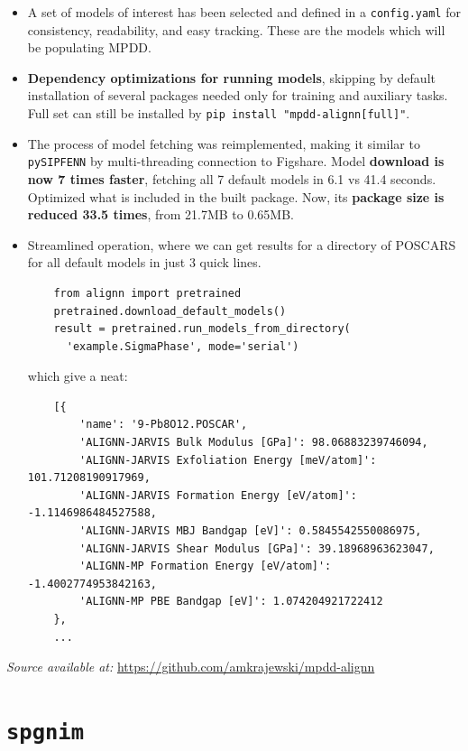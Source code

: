 \begin{itemize}
    \item A set of models of interest has been selected and defined in a \texttt{config.yaml} for consistency, readability, and easy tracking. These are the models which will be populating MPDD.
    \item \textbf{Dependency optimizations for running models}, skipping by default installation of several packages needed only for training and auxiliary tasks. Full set can still be installed by \texttt{pip install "mpdd-alignn[full]"}.
    \item The process of model fetching was reimplemented, making it similar to \texttt{pySIPFENN} by multi-threading connection to Figshare. Model \textbf{download is now 7 times faster}, fetching all 7 default models in 6.1 vs 41.4 seconds. Optimized what is included in the built package. Now, its \textbf{package size is reduced 33.5 times}, from 21.7MB to 0.65MB.
    \item Streamlined operation, where we can get results for a directory of POSCARS for all default models in just 3 quick lines.
    \begin{verbatim}
    from alignn import pretrained
    pretrained.download_default_models()
    result = pretrained.run_models_from_directory(
      'example.SigmaPhase', mode='serial')
    \end{verbatim}
    which give a neat:
    \begin{verbatim}
    [{
        'name': '9-Pb8O12.POSCAR',
        'ALIGNN-JARVIS Bulk Modulus [GPa]': 98.06883239746094,
        'ALIGNN-JARVIS Exfoliation Energy [meV/atom]': 101.71208190917969,
        'ALIGNN-JARVIS Formation Energy [eV/atom]': -1.1146986484527588,
        'ALIGNN-JARVIS MBJ Bandgap [eV]': 0.5845542550086975,
        'ALIGNN-JARVIS Shear Modulus [GPa]': 39.18968963623047,
        'ALIGNN-MP Formation Energy [eV/atom]': -1.4002774953842163,
        'ALIGNN-MP PBE Bandgap [eV]': 1.074204921722412
    },
    ...
    \end{verbatim}
\end{itemize}


\hspace{24pt} 
\textit{Source available at:} 
\href{https://github.com/amkrajewski/mpdd-alignn}{https://github.com/amkrajewski/mpdd-alignn}


\section{\texttt{spgnim}} \label{osoft:sec:spgnim}

